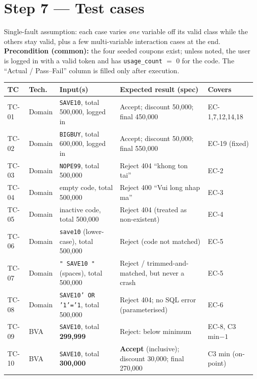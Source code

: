 \documentclass[11pt,a4paper]{article}
\newcommand{\code}[1]{\texttt{#1}}
\begin{document}
\section{Step 7 --- Test cases}

Single-fault assumption: each case varies \emph{one} variable off its valid class
while the others stay valid, plus a few multi-variable interaction cases at the end.
\textbf{Precondition (common):} the four seeded coupons exist; unless noted, the
user is logged in with a valid token and has \code{usage\_count} $=$ 0 for the code.
The ``Actual / Pass--Fail'' column is filled only after execution.

\begin{center}
\begin{longtable}{@{}C{1.15cm} C{1.15cm} L{4.7cm} L{4.6cm} L{2.9cm}@{}}
\toprule
\textbf{TC} & \textbf{Tech.} & \textbf{Input(s)} & \textbf{Expected result (spec)} & \textbf{Covers} \\
\midrule
\endhead
TC-01 & Domain & \code{SAVE10}, total 500{,}000, logged in & Accept; discount 50{,}000; final 450{,}000 & EC-1,7,12,14,18 \\
TC-02 & Domain & \code{BIGBUY}, total 600{,}000, logged in & Accept; discount 50{,}000; final 550{,}000 & EC-19 (fixed) \\
TC-03 & Domain & \code{NOPE99}, total 500{,}000 & Reject 404 ``khong ton tai'' & EC-2 \\
TC-04 & Domain & empty code, total 500{,}000 & Reject 400 ``Vui long nhap ma'' & EC-3 \\
TC-05 & Domain & inactive code, total 500{,}000 & Reject 404 (treated as non-existent) & EC-4 \\
TC-06 & Domain & \code{save10} (lower-case), total 500{,}000 & Reject (code not matched) & EC-5 \\
TC-07 & Domain & \code{" SAVE10 "} (spaces), total 500{,}000 & Reject / trimmed-and-matched, but never a crash & EC-5 \\
TC-08 & Domain & \code{SAVE10' OR '1'='1}, total 500{,}000 & Reject 404; no SQL error (parameterised) & EC-6 \\
TC-09 & BVA    & \code{SAVE10}, total \textbf{299{,}999} & Reject: below minimum & EC-8, C3 min$-1$ \\
TC-10 & BVA    & \code{SAVE10}, total \textbf{300{,}000} & \textbf{Accept} (inclusive); discount 30{,}000; final 270{,}000 & C3 min (on-point) \\

\end{longtable}
\end{center}
\end{document}
